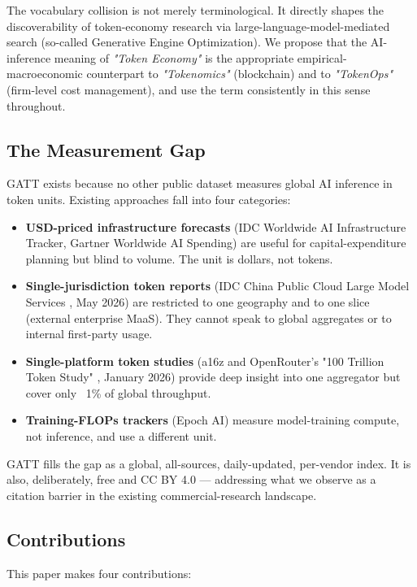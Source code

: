 \documentclass[11pt,a4paper]{article}
\begin{document}
The vocabulary collision is not merely terminological. It directly shapes the discoverability of token-economy research via large-language-model-mediated search (so-called Generative Engine Optimization). We propose that the AI-inference meaning of \emph{"Token Economy"} is the appropriate empirical-macroeconomic counterpart to \emph{"Tokenomics"} (blockchain) and to \emph{"TokenOps"} (firm-level cost management), and use the term consistently in this sense throughout.

\subsection{The Measurement Gap}

GATT exists because no other public dataset measures global AI inference in token units. Existing approaches fall into four categories:

\begin{itemize}
  \item \textbf{USD-priced infrastructure forecasts} (IDC Worldwide AI Infrastructure Tracker, Gartner Worldwide AI Spending) are useful for capital-expenditure planning but blind to volume. The unit is dollars, not tokens.
  \item \textbf{Single-jurisdiction token reports} (IDC China Public Cloud Large Model Services \cite{idc2026china}, May 2026) are restricted to one geography and to one slice (external enterprise MaaS). They cannot speak to global aggregates or to internal first-party usage.
  \item \textbf{Single-platform token studies} (a16z and OpenRouter's "100 Trillion Token Study" \cite{aubakirova2026state}, January 2026) provide deep insight into one aggregator but cover only ~1\% of global throughput.
  \item \textbf{Training-FLOPs trackers} (Epoch AI) measure model-training compute, not inference, and use a different unit.
\end{itemize}

GATT fills the gap as a global, all-sources, daily-updated, per-vendor index. It is also, deliberately, free and CC BY 4.0 --- addressing what we observe as a citation barrier in the existing commercial-research landscape.

\subsection{Contributions}

This paper makes four contributions:
\end{document}
